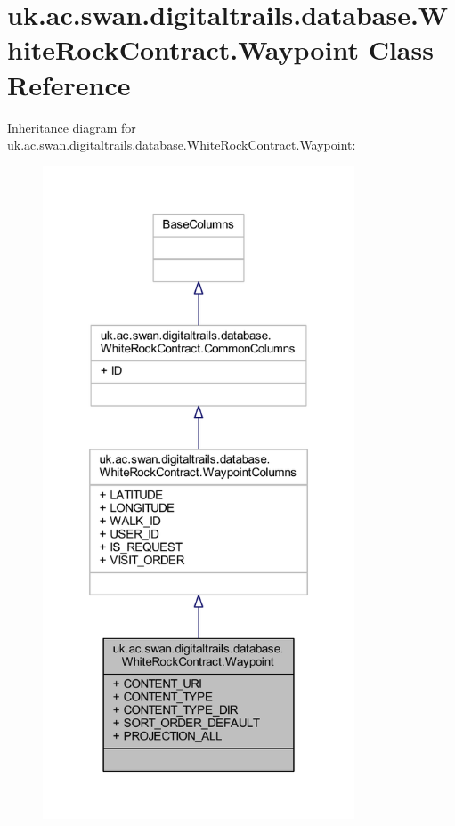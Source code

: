 \hypertarget{classuk_1_1ac_1_1swan_1_1digitaltrails_1_1database_1_1_white_rock_contract_1_1_waypoint}{\section{uk.\+ac.\+swan.\+digitaltrails.\+database.\+White\+Rock\+Contract.\+Waypoint Class Reference}
\label{classuk_1_1ac_1_1swan_1_1digitaltrails_1_1database_1_1_white_rock_contract_1_1_waypoint}
}


Inheritance diagram for uk.\+ac.\+swan.\+digitaltrails.\+database.\+White\+Rock\+Contract.\+Waypoint\+:
\nopagebreak
\begin{figure}[H]
\begin{center}
\leavevmode
\includegraphics[height=550pt]{classuk_1_1ac_1_1swan_1_1digitaltrails_1_1database_1_1_white_rock_contract_1_1_waypoint__inherit__graph}
\end{center}
\end{figure}


